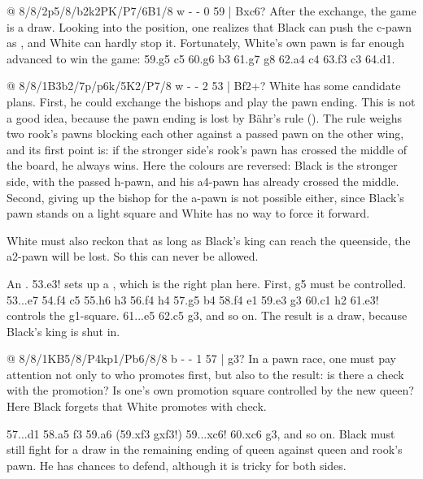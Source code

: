 @ 8/8/2p5/8/b2k2PK/P7/6B1/8 w - - 0 59 | Bxc6?
After the exchange, the game is a draw. Looking into the position, one realizes that Black can
push the c-pawn as , and White can hardly stop it. Fortunately, White's own pawn is
far enough advanced to win the game: 59.g5 c5 60.g6 \B b3 61.g7 \B g8 62.a4 c4 63.\B f3 c3 64.\B d1.

@ 8/8/1B3b2/7p/p6k/5K2/P7/8 w - - 2 53 | Bf2+?
White has some candidate plans. First, he could exchange the bishops and play the pawn ending.
This is not a good idea, because the pawn ending is lost by Bähr's rule
(). The rule weighs two rook's
pawns blocking each other against a passed pawn on the other wing, and its first point is: if the
stronger side's rook's pawn has crossed the middle of the board, he always wins. Here the colours
are reversed: Black is the stronger side, with the passed h-pawn, and his a4-pawn has already
crossed the middle. Second, giving up the bishop for the a-pawn is not possible either, since
Black's pawn stands on a light square and White has no way to force it forward.

White must also reckon that as long as Black's king can reach the queenside, the a2-pawn will be
lost. So this can never be allowed.

An .
53.\B e3! sets up a ,
which is the right plan here. First, g5 must be controlled. 53...\B e7 54.\B f4 \B c5 55.\B h6
\K h3 56.\B f4 h4 57.\B g5 \B b4 58.\B f4 \B e1 59.\B e3 \B g3 60.\B c1 \K h2 61.\B e3!
controls the g1-square. 61...\B e5 62.\B c5 \B g3, and so on. The result is a draw, because
Black's king is shut in.

@ 8/8/1KB5/8/P4kp1/Pb6/8/8 b - - 1 57 | g3?
In a pawn race, one must pay attention not only to who promotes first, but also to the
result: is
there a check with the promotion? Is one's own promotion square controlled by the new queen? Here
Black forgets that White promotes with check.

57...\B d1 58.a5 \B f3 59.a6 (59.\B xf3 gxf3!) 59...\B xc6! 60.\K xc6 g3, and so on. Black must
still fight for a draw in the remaining ending of queen against queen and rook's pawn. He has
chances to defend, although it is tricky for both sides.

